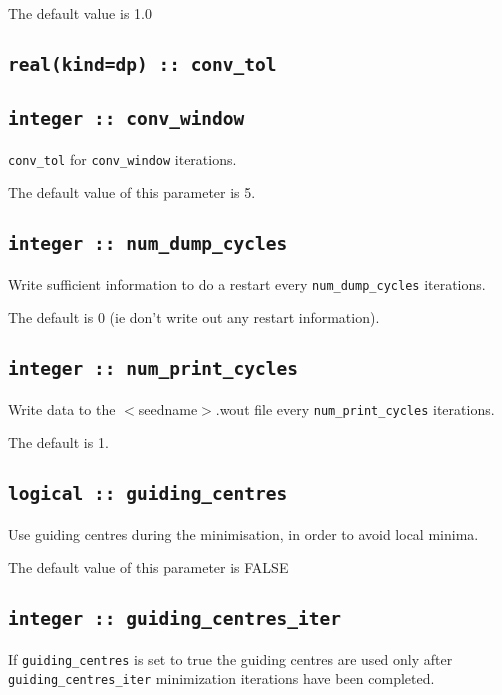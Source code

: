 The default value is 1.0

\subsection[conv\_tol]{\tt real(kind=dp) :: conv\_tol}


\subsection[conv\_window]{\tt integer :: conv\_window}

\verb#conv_tol# for \verb#conv_window# iterations.

The default value of this parameter is 5.


\subsection[num\_dump\_cycles]{\tt integer :: num\_dump\_cycles}
Write sufficient information to do a restart every
\verb#num_dump_cycles# iterations.

The default is 0 (ie don't write out any restart information).

\subsection[num\_print\_cycles]{\tt integer :: num\_print\_cycles}
Write data to the $<$seedname$>$.wout file every
\verb#num_print_cycles# iterations.
                                                                                                                              
The default is 1.
                                                                                                                              



\subsection[guiding\_centres]{\tt logical :: guiding\_centres}
Use guiding centres during the minimisation, in order to avoid
local minima.

The default value of this parameter is FALSE

\subsection[guiding\_centres\_iter]{\tt integer :: guiding\_centres\_iter}
If \verb#guiding_centres# is set to true the
guiding centres are used only after \verb#guiding_centres_iter# minimization iterations
have been completed.

